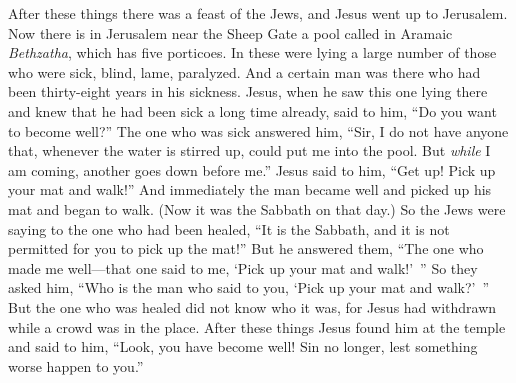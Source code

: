 \begin{biblechapter} %
 After these things there was a feast of the Jews, and Jesus went up to Jerusalem.
\verse Now there is in Jerusalem near the Sheep Gate a pool called in Aramaic \textit{Bethzatha}, which has five porticoes.
\verse In these were lying a large number of those who were sick, blind, lame, paralyzed.
\verse And a certain man was there who had been thirty-eight years in his sickness.
\verse Jesus, when he saw this one lying there and knew that he had been sick a long time already, said to him, “Do you want to become well?”
\verse The one who was sick answered him, “Sir, I do not have anyone that, whenever the water is stirred up, could put me into the pool. But \textit{while} I am coming, another goes down before me.”
\verse Jesus said to him, “Get up! Pick up your mat and walk!”
\verse And immediately the man became well and picked up his mat and began to walk. (Now it was the Sabbath on that day.)
\verse So the Jews were saying to the one who had been healed, “It is the Sabbath, and it is not permitted for you to pick up the mat!”
\verse But he answered them, “The one who made me well—that one said to me, ‘Pick up your mat and walk!’ ”
\verse So they asked him, “Who is the man who said to you, ‘Pick up your mat and walk?’ ”
\verse But the one who was healed did not know who it was, for Jesus had withdrawn while a crowd was in the place.
 After these things Jesus found him at the temple and said to him, “Look, you have become well! Sin no longer, lest something worse happen to you.”

\end{biblechapter}
